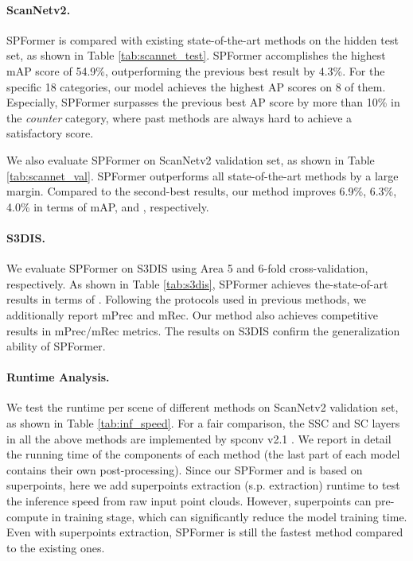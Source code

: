 \documentclass[letterpaper]{article} \usepackage{aaai23}  \usepackage{times}  \usepackage{helvet}  \usepackage{courier}  \usepackage[hyphens]{url}  \usepackage{graphicx} \urlstyle{rm} \def\UrlFont{\rm}  \usepackage{natbib}  \usepackage{caption} \frenchspacing  \setlength{\pdfpagewidth}{8.5in}  \setlength{\pdfpageheight}{11in}  \usepackage{algorithm}
\begin{document}
\paragraph{ScanNetv2.} SPFormer is compared with existing state-of-the-art methods on the hidden test set, as shown in Table \ref{tab:scannet_test}. SPFormer accomplishes the highest mAP score of 54.9\%, outperforming the previous best result by 4.3\%. For the specific 18 categories, our model achieves the highest AP scores on 8 of them. Especially, SPFormer surpasses the previous best AP score by more than 10\% in the \emph{counter} category,  where past methods are always hard to achieve a satisfactory score. 

We also evaluate SPFormer on ScanNetv2 validation set, as shown in Table \ref{tab:scannet_val}. SPFormer outperforms all state-of-the-art methods by a large margin. Compared to the second-best results, our method improves 6.9\%, 6.3\%, 4.0\% in terms of mAP,  and , respectively.

\paragraph{S3DIS.} We evaluate SPFormer on S3DIS using Area 5 and 6-fold cross-validation, respectively. As shown in Table \ref{tab:s3dis}, SPFormer achieves the-state-of-art results in terms of . Following the protocols used in previous methods, we additionally report mPrec and mRec. Our method also achieves competitive results in mPrec/mRec metrics. The results on S3DIS confirm the generalization ability of SPFormer.

\paragraph{Runtime Analysis.} 
We test the runtime per scene of different methods on ScanNetv2 validation set, as shown in Table \ref{tab:inf_speed}. For a fair comparison, the SSC and SC layers in all the above methods are implemented by spconv v2.1 \cite{spconv2}. We report in detail the running time of the components of each method (the last part of each model contains their own post-processing). Since our SPFormer and \cite{sstnet} is based on superpoints, here we add superpoints extraction (s.p. extraction) runtime to test the inference speed from raw input point clouds. However, superpoints can pre-compute in training stage, which can significantly reduce the model training time. Even with superpoints extraction, SPFormer is still the fastest method compared to the existing ones. 
\end{document}
